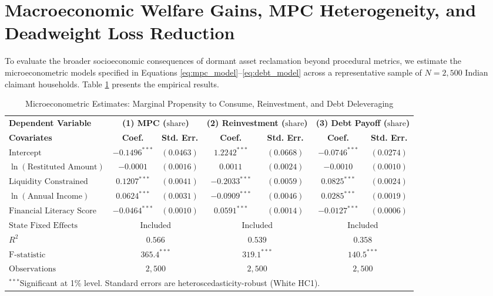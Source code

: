 \documentclass[openany]{book}
\begin{document}
\section{Macroeconomic Welfare Gains, MPC Heterogeneity, and Deadweight Loss Reduction}

To evaluate the broader socioeconomic consequences of dormant asset reclamation beyond procedural metrics, we estimate the microeconometric models specified in Equations \eqref{eq:mpc_model}--\eqref{eq:debt_model} across a representative sample of $N = 2,500$ Indian claimant households. Table \ref{tab:welfare_results} presents the empirical results.

\begin{table}[H]
\centering
\small
\begin{tabular}{lcccccc}
\hline\hline
\textbf{Dependent Variable} & \multicolumn{2}{c}{\textbf{(1) MPC ($\text{share}$)}} & \multicolumn{2}{c}{\textbf{(2) Reinvestment ($\text{share}$)}} & \multicolumn{2}{c}{\textbf{(3) Debt Payoff ($\text{share}$)}} \\
\textbf{Covariates} & \textbf{Coef.} & \textbf{Std. Err.} & \textbf{Coef.} & \textbf{Std. Err.} & \textbf{Coef.} & \textbf{Std. Err.} \\ \hline
$\text{Intercept}$ & $-0.1496^{***}$ & $(0.0463)$ & $1.2242^{***}$ & $(0.0668)$ & $-0.0746^{***}$ & $(0.0274)$ \\
$\ln(\text{Restituted Amount})$ & $-0.0001$ & $(0.0016)$ & $0.0011$ & $(0.0024)$ & $-0.0010$ & $(0.0010)$ \\
$\text{Liquidity Constrained}$ & $0.1207^{***}$ & $(0.0041)$ & $-0.2033^{***}$ & $(0.0059)$ & $0.0825^{***}$ & $(0.0024)$ \\
$\ln(\text{Annual Income})$ & $0.0624^{***}$ & $(0.0031)$ & $-0.0909^{***}$ & $(0.0046)$ & $0.0285^{***}$ & $(0.0019)$ \\
$\text{Financial Literacy Score}$ & $-0.0464^{***}$ & $(0.0010)$ & $0.0591^{***}$ & $(0.0014)$ & $-0.0127^{***}$ & $(0.0006)$ \\
$\text{State Fixed Effects}$ & \multicolumn{2}{c}{Included} & \multicolumn{2}{c}{Included} & \multicolumn{2}{c}{Included} \\ \hline
$R^2$ & \multicolumn{2}{c}{$0.566$} & \multicolumn{2}{c}{$0.539$} & \multicolumn{2}{c}{$0.358$} \\
$\text{F-statistic}$ & \multicolumn{2}{c}{$365.4^{***}$} & \multicolumn{2}{c}{$319.1^{***}$} & \multicolumn{2}{c}{$140.5^{***}$} \\
$\text{Observations}$ & \multicolumn{2}{c}{$2,500$} & \multicolumn{2}{c}{$2,500$} & \multicolumn{2}{c}{$2,500$} \\
\hline\hline
\multicolumn{7}{l}{\footnotesize $^{***}$Significant at 1\% level. Standard errors are heteroscedasticity-robust (White HC1).}
\end{tabular}
\caption{Microeconometric Estimates: Marginal Propensity to Consume, Reinvestment, and Debt Deleveraging}
\label{tab:welfare_results}
\end{table}
\end{document}
